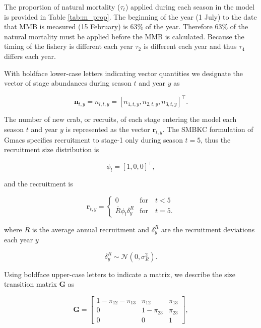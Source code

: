 \documentclass[]{article}
\begin{document}
The proportion of natural mortality (\(\tau_t\)) applied during each
season in the model is provided in Table \ref{tab:m_prop}. The beginning
of the year (1 July) to the date that MMB is measured (15 February) is
63\% of the year. Therefore 63\% of the natural mortality must be
applied before the MMB is calculated. Because the timing of the fishery
is different each year \(\tau_2\) is different each year and thus
\(\tau_4\) differs each year.

With boldface lower-case letters indicating vector quantities we
designate the vector of stage abundances during season \(t\) and year
\(y\) as

\begin{equation}
    \boldsymbol{n}_{t,y} = n_{l,t,y} = \left[ n_{1,t,y}, n_{2,t,y}, n_{3,t,y} \right]^\top.
\end{equation}

The number of new crab, or recruits, of each stage entering the model
each season \(t\) and year \(y\) is represented as the vector
\(\boldsymbol{r}_{t,y}\). The SMBKC formulation of Gmacs specifies
recruitment to stage-1 only during season \(t=5\), thus the recruitment
size distribution is

\begin{equation}
    \phi_l = \left[ 1, 0, 0 \right]^\top,
\end{equation}

and the recruitment is

\begin{equation}
  \boldsymbol{r}_{t,y} = 
  \begin{cases}
    0 &\text{for} \quad t<5\\
    \bar{R} \phi_l \delta^R_y &\text{for} \quad t=5.
  \end{cases}
\end{equation}

where \(\bar{R}\) is the average annual recruitment and \(\delta^R_y\)
are the recruitment deviations each year \(y\)

\begin{equation}
    \delta^R_y \sim \mathcal{N} \left( 0, \sigma_R^2 \right).
\end{equation}

Using boldface upper-case letters to indicate a matrix, we describe the
size transition matrix \(\boldsymbol{G}\) as

\begin{equation}
  \boldsymbol{G} = \left[ \begin{array}{ccc}
    1 - \pi_{12} - \pi_{13} & \pi_{12} & \pi_{13} \\
    0 & 1 - \pi_{23} & \pi_{23} \\
    0 & 0 & 1 \end{array} \right],
\end{equation}
\end{document}
